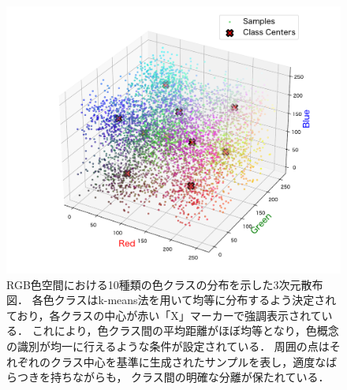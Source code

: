 \begin{figure}[H]
    \centering
    \includegraphics[width=1\columnwidth]{fig/DistributionColors.pdf}
    \caption[RGB色空間における10種類の色クラスの分布を示した3次元散布図]{
        RGB色空間における10種類の色クラスの分布を示した3次元散布図．
        各色クラスはk-means法を用いて均等に分布するよう決定されており，各クラスの中心が赤い「X」マーカーで強調表示されている．
        これにより，色クラス間の平均距離がほぼ均等となり，色概念の識別が均一に行えるような条件が設定されている．
        周囲の点はそれぞれのクラス中心を基準に生成されたサンプルを表し，適度なばらつきを持ちながらも，
        クラス間の明確な分離が保たれている．
    }
    \label{fig:DistributionColors}
\end{figure}

